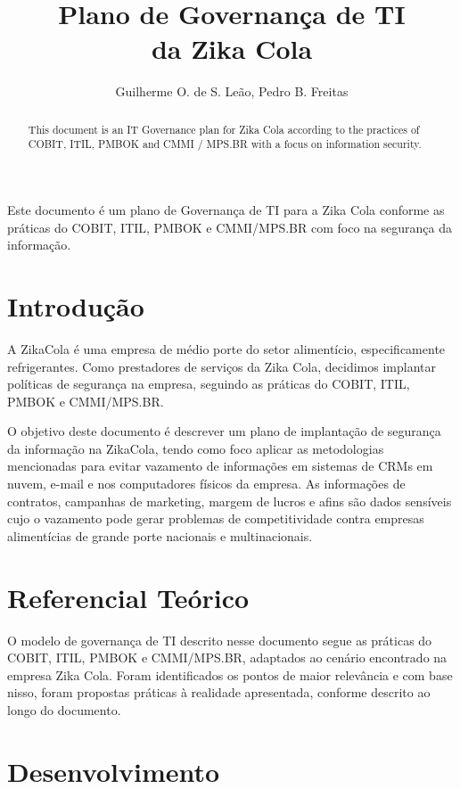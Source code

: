 \documentclass[12pt]{article}
\title{Plano de Governança de TI\\ da Zika Cola}
\author{Guilherme O. de S. Leão, Pedro B. Freitas}
\begin{document}
 

\maketitle
     
\begin{abstract}
  This document is an IT Governance plan for Zika Cola according to the practices of COBIT, ITIL, PMBOK and CMMI / MPS.BR with a focus on information security.
\end{abstract}     
     
\begin{resumo} 
Este documento é um plano de Governança de TI para a Zika Cola conforme as práticas do COBIT, ITIL, PMBOK e CMMI/MPS.BR com foco na segurança da informação.
\end{resumo}


\section{Introdução}

A ZikaCola é uma empresa de médio porte do setor alimentício, especificamente refrigerantes. Como prestadores de serviços da Zika Cola, decidimos implantar políticas de segurança na empresa, seguindo as práticas do COBIT, ITIL, PMBOK e CMMI/MPS.BR.

O objetivo deste documento é descrever um plano de implantação de segurança da informação na ZikaCola, tendo como foco aplicar as metodologias mencionadas para evitar vazamento de informações em sistemas de CRMs em nuvem, e-mail e nos computadores físicos da empresa. As informações de contratos, campanhas de marketing, margem de lucros e afins são dados sensíveis cujo o vazamento pode gerar problemas de competitividade contra empresas alimentícias de grande porte nacionais e multinacionais.  


\section{Referencial Teórico} 

O modelo de governança de TI descrito nesse documento segue as práticas do COBIT, ITIL, PMBOK e CMMI/MPS.BR, adaptados ao cenário encontrado na empresa Zika Cola. Foram identificados os pontos de maior relevância e com base nisso, foram propostas práticas à realidade apresentada, conforme descrito ao longo do documento.

\section{Desenvolvimento}
\end{document}
